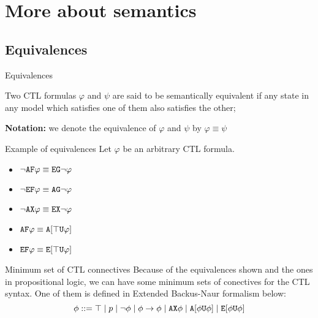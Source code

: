 \section{More about semantics}
\subsection{Equivalences}

\begin{frame}{Equivalences}
	\begin{definition}
		Two CTL formulas $\varphi$ and $\psi$ are said to be \alert{semantically	equivalent} if any state in any model which satisfies one of them also satisfies the other; 
	\end{definition}\pause
	\textbf{Notation:} we denote the equivalence of $\varphi$ and $\psi$ by $\varphi \equiv \psi$
\end{frame}

\begin{frame}{Example of equivalences}
    Let $\varphi$ be an arbitrary CTL formula.
        
    \begin{itemize}
        \item
        {
            $\neg \texttt{A}\texttt{F} \varphi \equiv \texttt{E}\texttt{G} \neg \varphi $    
        }
        \item
        {
            $\neg \texttt{E}\texttt{F} \varphi \equiv \texttt{A}\texttt{G} \neg \varphi$    
        }
        \item
        {
            $\neg \texttt{A}\texttt{X} \varphi \equiv \texttt{E}\texttt{X} \neg \varphi$    
        }
        \item
        {
            $\texttt{A}\texttt{F}\varphi \equiv \texttt{A}[\top \texttt{U}\varphi]$    
        }
        \item
        {
            $\texttt{E}\texttt{F} \varphi \equiv \texttt{E}[\top \texttt{U}\varphi]$    
        }
    \end{itemize}
\end{frame}

\begin{frame}{Minimum set of CTL connectives}
    Because of the equivalences shown and the ones in propositional logic, we can have some minimum sets of conectives for the CTL syntax. One of them is defined in Extended Backus-Naur formalism below:
    $$\phi ::=  \top \; | \; p \; | \; \neg \phi \; | \; \phi \to \phi \; | \; \texttt{A}\texttt{X} \phi \; | \;  \texttt{A}[\phi\texttt{U}\phi] \; | \; \texttt{E}[\phi\texttt{U}\phi]$$
\end{frame}